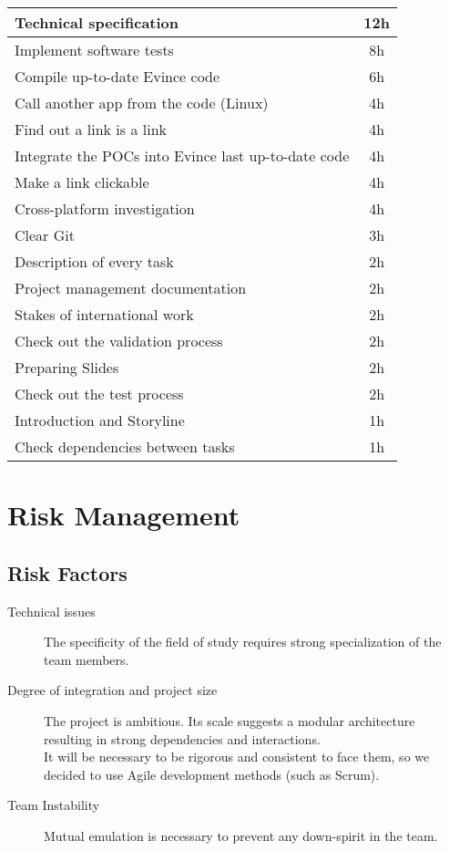 \documentclass{article}%
\begin{document}
\begin{tabular}{|l|c|}
\hline
Technical specification & 12h \\ \hline
Implement software tests & 8h \\ \hline
Compile up-to-date Evince code & 6h \\ \hline
Call another app from the code (Linux) & 4h \\ \hline
Find out a link is a link & 4h \\ \hline
Integrate the POCs into Evince last up-to-date code & 4h \\ \hline
Make a link clickable & 4h \\ \hline
Cross-platform investigation & 4h \\ \hline
Clear Git & 3h \\ \hline
Description of every task & 2h \\ \hline
Project management documentation & 2h \\ \hline
Stakes of international work & 2h \\ \hline
Check out the validation process & 2h \\ \hline
Preparing Slides & 2h \\ \hline
Check out the test process & 2h \\ \hline
Introduction and Storyline & 1h \\ \hline
Check dependencies between tasks & 1h \\ \hline
\end{tabular}


\section{Risk Management}
\subsection{Risk Factors}

\begin{description}
\item[Technical issues] The specificity of the field of study requires
strong specialization of the team members.
\item [Degree of integration and project size] The project is ambitious.
Its scale suggests a modular architecture
resulting in strong dependencies and interactions. \\
It will be necessary to be rigorous and consistent to face them, 
so we decided to use Agile development methods (such as Scrum).
\item [Team Instability] Mutual emulation is necessary to
prevent any down-spirit in the team.
\end {description}
\end{document}
